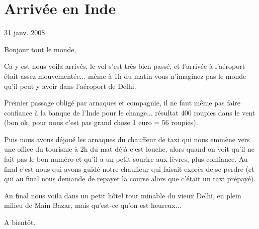 \section{Arrivée en Inde}

31 janv. 2008

\begin{multicols}{2}

Bonjour tout le monde,

Ca y est nous voila arrivés, le vol s'est très bien passé, et l'arrivée à l'aéroport était assez mouvementée... même à 1h du matin vous n'imaginez pas le monde qu'il peut y avoir dans l'aéroport de Delhi.


Premier passage obligé par arnaques et compagnie, il ne faut même pas faire confiance à la banque de l'Inde pour le change... résultat 400 roupies dans le vent (bon ok, pour nous c'est pas grand chose 1 euro = 56 roupies).


Puis nous avons déjoué les arnaques du chauffeur de taxi qui nous emmène vers une office du tourisme à 2h du mat déjà c'est louche, alors quand on voit qu'il ne fait pas le bon numéro et qu'il a un petit sourire aux lèvres, plus confiance. Au final c'est nous qui avons guidé notre chauffeur qui faisait exprès de se perdre (et qui au final nous demande de repayer la course alors que c'était un taxi prépayé).

Au final nous voila dans un petit hôtel tout minable du vieux Delhi, en plein milieu de Main Bazar, mais qu'est-ce qu'on est heureux...

A bientôt.


\end{multicols}


